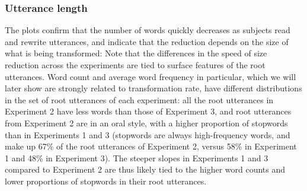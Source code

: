 \subsubsection{Utterance length}\label{utterance-length}

The plots confirm that the number of words quickly decreases as subjects
read and rewrite utterances, and indicate that the reduction depends on
the size of what is being transformed:
Note that the differences
in the speed of size reduction across the experiments are tied to
surface features of the root utterances. Word count and average word
frequency in particular, which we will later show are strongly related
to transformation rate, have different distributions in the set of root
utterances of each experiment: all the root utterances in Experiment 2
have less words than those of Experiment 3, and root utterances from
Experiment 2 are in an oral style, with a higher proportion of stopwords
than in Experiments 1 and 3 (stopwords are always high-frequency words,
and make up 67\% of the root utterances of Experiment 2, versus 58\% in
Experiment 1 and 48\% in Experiment 3). The steeper slopes in
Experiments 1 and 3 compared to Experiment 2 are thus likely tied to the higher
word counts and lower proportions of stopwords in their root utterances.

